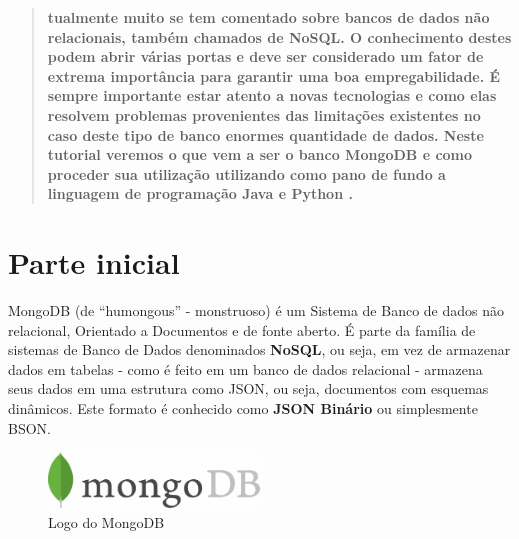 \documentclass[a4paper,11pt]{article}
\begin{document}
	
\maketitle %
\thispagestyle{fancy} %

	
\begin{abstract}
\textbf{tualmente muito se tem comentado sobre bancos de dados não relacionais, também chamados de NoSQL. O conhecimento destes podem abrir várias portas e deve ser considerado um fator de extrema importância para garantir uma boa empregabilidade. É sempre importante estar atento a novas tecnologias e como elas resolvem problemas provenientes das limitações existentes no caso deste tipo de banco enormes quantidade de dados. Neste tutorial veremos o que vem a ser o banco MongoDB \cite{mongooficial} e como proceder sua utilização utilizando como pano de fundo a linguagem de programação Java \cite{javaoficial} e Python \cite{pythonoficial}.}
\end{abstract}


\section{Parte inicial}
MongoDB (de ``humongous'' - monstruoso) é um Sistema de Banco de dados não relacional, Orientado a Documentos e de fonte aberto. É parte da família de sistemas de Banco de Dados denominados \textbf{NoSQL}, ou seja, em vez de armazenar dados em tabelas - como é feito em um banco de dados relacional - armazena seus dados em uma estrutura como JSON, ou seja, documentos com esquemas dinâmicos. Este formato é conhecido como \textbf{JSON Binário} ou simplesmente BSON.
\begin{figure}[H]
	\centering
	\includegraphics[width=0.5\textwidth]{imagens/logo.jpg}
	\caption{Logo do MongoDB}
\end{figure}
\end{document}
